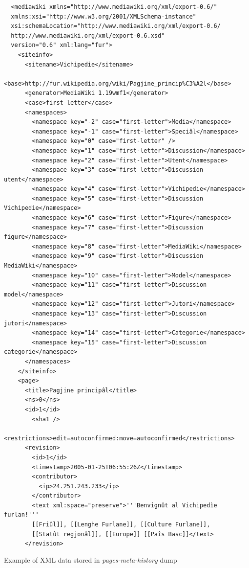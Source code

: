 \begin{program}
  \begin{small}
  \begin{verbatim}
  <mediawiki xmlns="http://www.mediawiki.org/xml/export-0.6/" 
  xmlns:xsi="http://www.w3.org/2001/XMLSchema-instance" 
  xsi:schemaLocation="http://www.mediawiki.org/xml/export-0.6/ 
  http://www.mediawiki.org/xml/export-0.6.xsd" 
  version="0.6" xml:lang="fur">
    <siteinfo>
      <sitename>Vichipedie</sitename>
      <base>http://fur.wikipedia.org/wiki/Pagjine_princip%C3%A2l</base>
      <generator>MediaWiki 1.19wmf1</generator>
      <case>first-letter</case>
      <namespaces>
        <namespace key="-2" case="first-letter">Media</namespace>
        <namespace key="-1" case="first-letter">Speciâl</namespace>
        <namespace key="0" case="first-letter" />
        <namespace key="1" case="first-letter">Discussion</namespace>
        <namespace key="2" case="first-letter">Utent</namespace>
        <namespace key="3" case="first-letter">Discussion utent</namespace>
        <namespace key="4" case="first-letter">Vichipedie</namespace>
        <namespace key="5" case="first-letter">Discussion Vichipedie</namespace>
        <namespace key="6" case="first-letter">Figure</namespace>
        <namespace key="7" case="first-letter">Discussion figure</namespace>
        <namespace key="8" case="first-letter">MediaWiki</namespace>
        <namespace key="9" case="first-letter">Discussion MediaWiki</namespace>
        <namespace key="10" case="first-letter">Model</namespace>
        <namespace key="11" case="first-letter">Discussion model</namespace>
        <namespace key="12" case="first-letter">Jutori</namespace>
        <namespace key="13" case="first-letter">Discussion jutori</namespace>
        <namespace key="14" case="first-letter">Categorie</namespace>
        <namespace key="15" case="first-letter">Discussion categorie</namespace>
      </namespaces>
    </siteinfo> 
    <page>
      <title>Pagjine principâl</title>
      <ns>0</ns>
      <id>1</id>
        <sha1 />
      <restrictions>edit=autoconfirmed:move=autoconfirmed</restrictions>
      <revision>
        <id>1</id>
        <timestamp>2005-01-25T06:55:26Z</timestamp>
        <contributor>
          <ip>24.251.243.233</ip>
        </contributor>
        <text xml:space="preserve">'''Benvignût al Vichipedìe furlan!'''
        [[Friûl]], [[Lenghe Furlane]], [[Culture Furlane]], 
        [[Statût regjonâl]], [[Europe]] [[Paîs Basc]]</text>
      </revision>
  \end{verbatim}
  \end{small}
  \caption{Example of XML data stored in \textit{pages-meta-history} dump}
  \label{code:xml-dump-1}
\end{program}

